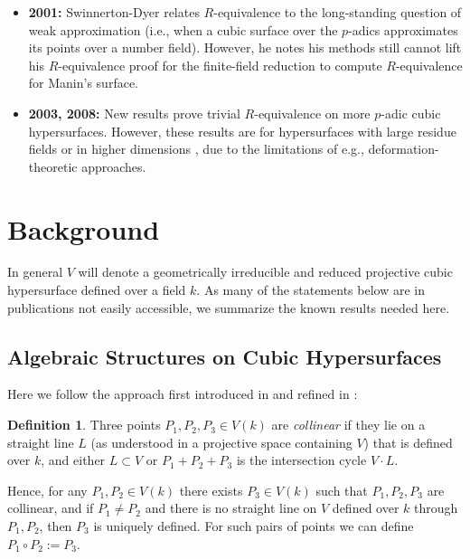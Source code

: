 \documentclass[11pt]{article}
\theoremstyle{definition}
\newtheorem{definition}[theorem]{Definition}
\begin{document}
\begin{itemize}
  \item \textbf{2001:} Swinnerton-Dyer \cite[\S 6]{weak-approx} relates $R$-equivalence to the long-standing question of weak approximation (i.e., when a cubic surface over the $p$-adics approximates its points over a number field). However, he notes his methods still cannot lift his $R$-equivalence proof for the finite-field reduction to compute $R$-equivalence for Manin's surface.
  \item \textbf{2003, 2008:} New results prove trivial $R$-equivalence on more $p$-adic cubic hypersurfaces. However, these results are for hypersurfaces with large residue fields \cite{kollar2003rational} or in higher dimensions \cite{madore2003equivalence, madore2008equivalence}, due to the limitations of e.g., deformation-theoretic approaches.
\end{itemize}

\section{Background}
\label{sec:background}

In general $V$ will denote a geometrically irreducible and reduced projective cubic hypersurface defined over a field $k$. As many of the statements below are in publications not easily accessible, we summarize the known results needed here.

\subsection{Algebraic Structures on Cubic Hypersurfaces}

Here we follow the approach first introduced in \cite{manin1968cubic} and refined in \cite{manin3}:

\begin{definition}
Three points $P_1, P_2, P_3 \in V(k)$ are \textit{collinear} if they lie on a straight line $L$ (as understood in a projective space containing $V$) that is defined over $k$, and either $L \subset V$ or $P_1+P_2+P_3$ is the intersection cycle $V \cdot L$.
\end{definition}

Hence, for any $P_1,P_2 \in V(k)$ there exists $P_3 \in V(k)$ such that $P_1,P_2,P_3$ are collinear, and if $P_1 \neq P_2$ and there is no straight line on $V$ defined over $k$ through $P_1, P_2$, then $P_3$ is uniquely defined. For such pairs of points we can define $P_1 \circ P_2 := P_3$.
\end{document}
